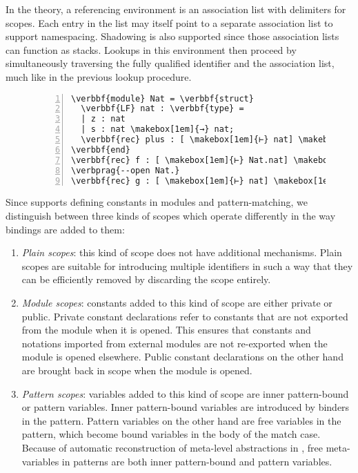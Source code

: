 
In the theory, a referencing environment is an association list with delimiters for scopes.
Each entry in the list may itself point to a separate association list to support namespacing.
Shadowing is also supported since those association lists can function as stacks.
Lookups in this environment then proceed by simultaneously traversing the fully qualified identifier and the association list, much like in the previous lookup procedure.


\begin{figure}[htb]
\begin{Verbatim}[commandchars=\\\{\}, baselinestretch=1, numbers=left]
\verbbf{module} Nat = \verbbf{struct}
  \verbbf{LF} nat : \verbbf{type} =
  | z : nat
  | s : nat \makebox[1em]{→} nat;
  \verbbf{rec} plus : [ \makebox[1em]{⊢} nat] \makebox[1em]{→} [ \makebox[1em]{⊢} nat] \makebox[1em]{→} [ \makebox[1em]{⊢} nat] = \verbhole{?h1};
\verbbf{end}
\verbbf{rec} f : [ \makebox[1em]{⊢} Nat.nat] \makebox[1em]{→} [ \makebox[1em]{⊢} Nat.nat] = \verbhole{?h2};
\verbprag{--open Nat.}
\verbbf{rec} g : [ \makebox[1em]{⊢} nat] \makebox[1em]{→} [ \makebox[1em]{⊢} nat] = \verbhole{?h3};
\end{Verbatim}
\caption[]{%
}
\label{figure:referencing-environment-example}
\end{figure}


Since \Beluga supports defining constants in modules and pattern-matching, we distinguish between three kinds of scopes which operate differently in the way bindings are added to them:
\begin{enumerate}
\item
\textit{Plain scopes}: this kind of scope does not have additional mechanisms.
Plain scopes are suitable for introducing multiple identifiers in such a way that they can be efficiently removed by discarding the scope entirely.
\item
\textit{Module scopes}: constants added to this kind of scope are either private or public.
Private constant declarations refer to constants that are not exported from the module when it is opened.
This ensures that constants and notations imported from external modules are not re-exported when the module is opened elsewhere.
Public constant declarations on the other hand are brought back in scope when the module is opened.
\item
\textit{Pattern scopes}: variables added to this kind of scope are inner pattern-bound or pattern variables.
Inner pattern-bound variables are introduced by binders in the pattern.
Pattern variables on the other hand are free variables in the pattern, which become bound variables in the body of the match case.
Because of automatic reconstruction of meta-level abstractions in \Beluga, free meta-variables in patterns are both inner pattern-bound and pattern variables.
\end{enumerate}

